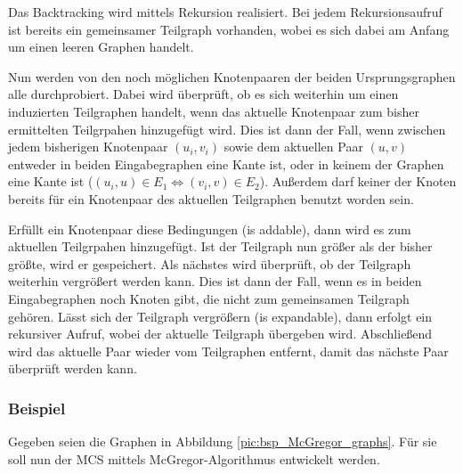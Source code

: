 Das Backtracking wird mittels Rekursion realisiert. Bei jedem 
Rekursionsaufruf ist bereits ein gemeinsamer Teilgraph vorhanden, 
wobei es sich dabei am Anfang um einen leeren Graphen handelt.

Nun werden von den noch möglichen Knotenpaaren der beiden 
Ursprungsgraphen alle durchprobiert. Dabei wird überprüft, ob es 
sich weiterhin um einen induzierten Teilgraphen handelt, wenn das 
aktuelle Knotenpaar zum bisher ermittelten Teilgrpahen hinzugefügt 
wird. Dies ist dann der Fall, wenn zwischen jedem bisherigen 
Knotenpaar $(u_i,v_i)$ sowie dem aktuellen Paar $(u,v)$ entweder in 
beiden Eingabegraphen eine Kante ist, oder in keinem der Graphen 
eine Kante ist ($(u_i,u) \in E_1 \Leftrightarrow (v_i,v) \in E_2$). 
Außerdem darf keiner der Knoten bereits für ein Knotenpaar des 
aktuellen Teilgraphen benutzt worden sein.

Erfüllt ein Knotenpaar diese Bedingungen (is addable), dann wird es zum 
aktuellen Teilgrpahen hinzugefügt. Ist der Teilgraph nun größer als der bisher 
größte, wird er gespeichert. Als nächstes wird überprüft, ob der Teilgraph 
weiterhin vergrößert werden kann. Dies ist dann der Fall, wenn es 
in beiden Eingabegraphen noch Knoten gibt, die nicht zum gemeinsamen Teilgraph 
gehören. Lässt sich der Teilgraph vergrößern (is expandable), dann erfolgt 
ein rekursiver Aufruf, wobei der aktuelle Teilgraph übergeben wird. 
Abschließend wird das aktuelle Paar wieder vom Teilgraphen entfernt, damit 
das nächste Paar überprüft werden kann.

\subsubsection{Beispiel}
Gegeben seien die Graphen in Abbildung \ref{pic:bsp_McGregor_graphs}. Für sie soll nun 
der MCS mittels McGregor-Algorithmus entwickelt werden.


